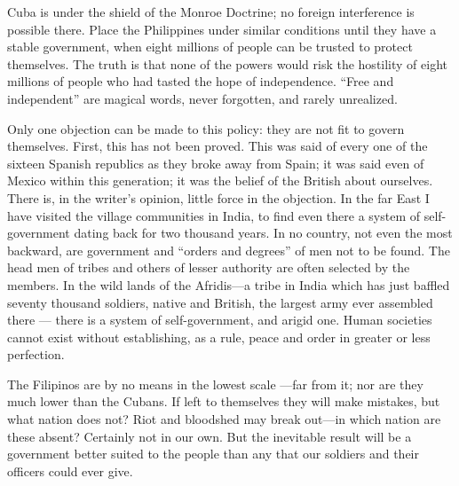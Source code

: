 \documentclass[11pt,openany]{book}
\begin{document}
Cuba is under the shield of the Monroe Doctrine; no foreign interference is possible there. Place the Philippines under similar conditions until they have a stable government, when eight millions of people can be trusted to protect themselves. The truth is that none of the powers would risk the hostility of eight millions of people who had tasted the hope of independence. ``Free and independent'' are magical words, never forgotten, and rarely unrealized.

Only one objection can be made to this policy: they are not fit to govern themselves. First, this has not been proved. This was said of every one of the sixteen Spanish republics as they broke away from Spain; it was said even of Mexico within this generation; it was the belief of the British about ourselves. There is, in the writer's opinion, little force in the objection. In the far East I have visited the village communities in India, to find even there a system of self-government dating back for two thousand years. In no country, not even the most backward, are government and ``orders and degrees'' of men not to be found. The head men of tribes and others of lesser authority are often selected by the members. In the wild lands of the Afridis---a tribe in India which has just baffled seventy thousand soldiers, native and British, the largest army ever assembled there --- there is a system of self-government, and arigid one. Human societies cannot exist without establishing, as a rule, peace and order in greater or less perfection.

The Filipinos are by no means in the lowest scale ---far from it; nor are they much lower than the Cubans. If left to themselves they will make mistakes, but what nation does not? Riot and bloodshed may break out---in which nation are these absent? Certainly not in our own. But the inevitable result will be a government better suited to the people than any that our soldiers and their officers could ever give.
\end{document}
